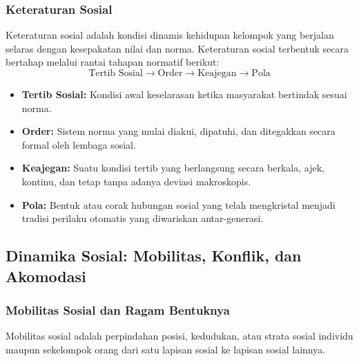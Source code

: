 \documentclass[12pt, a4paper]{article}
\begin{document}
\subsubsection{Keteraturan Sosial}
Keteraturan sosial adalah kondisi dinamis kehidupan kelompok yang berjalan selaras dengan kesepakatan nilai dan norma. Keteraturan sosial terbentuk secara bertahap melalui rantai tahapan normatif berikut:
$$\text{Tertib Sosial} \longrightarrow \text{Order} \longrightarrow \text{Keajegan} \longrightarrow \text{Pola}$$
\begin{itemize}
    \item \textbf{Tertib Sosial:} Kondisi awal keselarasan ketika masyarakat bertindak sesuai norma.
    \item \textbf{Order:} Sistem norma yang mulai diakui, dipatuhi, dan ditegakkan secara formal oleh lembaga sosial.
    \item \textbf{Keajegan:} Suatu kondisi tertib yang berlangsung secara berkala, ajek, kontinu, dan tetap tanpa adanya deviasi makroskopis.
    \item \textbf{Pola:} Bentuk atau corak hubungan sosial yang telah mengkristal menjadi tradisi perilaku otomatis yang diwariskan antar-generasi.
\end{itemize}

\subsection{Dinamika Sosial: Mobilitas, Konflik, dan Akomodasi}

\subsubsection{Mobilitas Sosial dan Ragam Bentuknya}
Mobilitas sosial adalah perpindahan posisi, kedudukan, atau strata sosial individu maupun sekelompok orang dari satu lapisan sosial ke lapisan sosial lainnya. 
\end{document}
